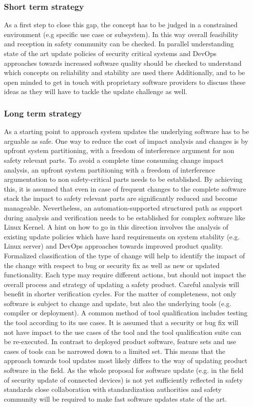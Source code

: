 \documentclass[12pt]{ElisaPaper}
\begin{document}
\subsubsection{Short term strategy}
As a first step to close this gap, the concept has to be judged in a constrained environment (e.g specific use case or subsystem).
In this way overall feasibility and reception in safety community can be checked.
In parallel understanding state of the art update policies of security critical systems and DevOps approaches towards increased software quality should be checked to understand which concepts on reliability and stability are used there Additionally, and to be open minded to get in touch with proprietary software providers to discuss these ideas as they will have to tackle the update challenge as well.

\subsubsection{Long term strategy}
As a starting point to approach system updates the underlying software has to be arguable as safe.  
One way to reduce the cost of impact analysis and changes is by upfront system partitioning, with a freedom of interference argument for non safety relevant parts.
To avoid a complete time consuming change impact analysis, an upfront system partitioning with a  freedom of interference argumentation to non safety-critical parts needs to be established.
By achieving this, it is assumed that even in case of frequent changes to the complete software stack the impact to safety relevant parts are significantly reduced and become manageable. 
Nevertheless, an automation-supported structured path as support during analysis and verification needs to be established for complex software like Linux Kernel. 
A hint on how to go in this direction involves the analysis of existing update policies which have hard requirements on system stability (e.g. Linux server) and DevOps approaches towards improved product quality. 
Formalized classification of the type of change will help to identify the impact of the change with respect to bug or security fix as well as new or updated functionality. 
Each type may require different actions, but should not impact the overall process and strategy of updating a safety product. 
Careful analysis will benefit in shorter verification cycles. 
For the matter of completeness, not only software is subject to change and update, but also the underlying tools (e.g. compiler or deployment). 
A common method of tool qualification includes testing the tool according to its use cases. 
It is assumed that a security or bug fix will not have impact to the use cases of the tool and the tool qualification suite can be re-executed. 
In contrast to deployed product software, feature sets and use cases of tools can be narrowed down to a limited set. 
This means that the approach towards tool updates most likely differs to the way of updating product software in the field.
As the whole proposal for software update (e.g. in the field of security update of connected devices)  is not yet sufficiently reflected in safety standards close collaboration with standardization authorities and safety community will be required to make fast software updates state of the art.
\end{document}
